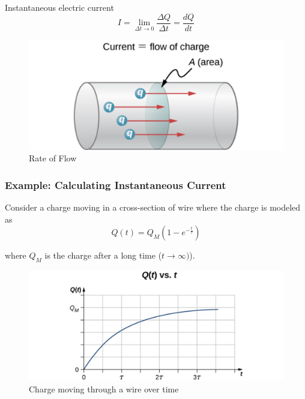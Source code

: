 \documentclass[14pt]{memoir}
\begin{document}
Instantaneous electric current
\begin{equation}
I = \lim_{\Delta t \rightarrow 0} \frac{\Delta Q}{\Delta t} = \frac{dQ}{dt}
\end{equation}


\begin{figure}[H]
\begin{center}
\includegraphics[scale=0.50]{fig/fig_09_02.jpg}
\caption{Rate of Flow}
\label{fig:09_02}
\end{center}
\end{figure}


\subsubsection{Example: Calculating Instantaneous Current}

Consider a charge moving in a cross-section of wire where the charge is modeled as
\begin{equation}
Q(t) = Q_M (1 - e^{-\frac{t}{\tau}})
\end{equation}

where $Q_M$ is the charge after a long time ($t \rightarrow \infty)$).

\begin{figure}[H]
\begin{center}
\includegraphics[scale=0.50]{fig/fig_09_03.jpg}
\caption{Charge moving through a wire over time}
\label{fig:09_03}
\end{center}
\end{figure}
\end{document}
